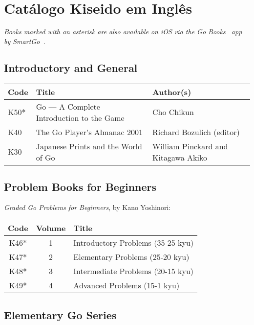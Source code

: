 \chapter{Catálogo Kiseido em Inglês}\label{ap:en}

\emph{Books marked with an asterisk are also available on iOS via the Go Books~\cite{gobooks} app by SmartGo~\cite{smartgo}.}

\section{Introductory and General}

\begin{longtable}{l|p{50mm}|p{50mm}} 
    \hline
    \textbf{Code} & \textbf{Title} & \textbf{Author(s)} \\
    \hline \hline
    K50* & Go --- A Complete Introduction to the Game & Cho Chikun \\
    \hline
    K40 & The Go Player's Almanac 2001 & Richard Bozulich (editor) \\
    \hline
    K30 & Japanese Prints and the World of Go & William Pinckard and Kitagawa Akiko \\
    \hline
\end{longtable}


\section{Problem Books for Beginners}

\emph{Graded Go Problems for Beginners}, by Kano Yoshinori:

\begin{longtable}{c|c|l} 
    \hline
    \textbf{Code} & \textbf{Volume} & \textbf{Title} \\
    \hline \hline
    K46* & 1 & Introductory Problems (35-25 kyu) \\
    \hline
    K47* & 2 & Elementary Problems (25-20 kyu) \\
    \hline
    K48* & 3 & Intermediate Problems (20-15 kyu) \\
    \hline
    K49* & 4 & Advanced Problems (15-1 kyu) \\
    \hline
\end{longtable}


\section{Elementary Go Series}

